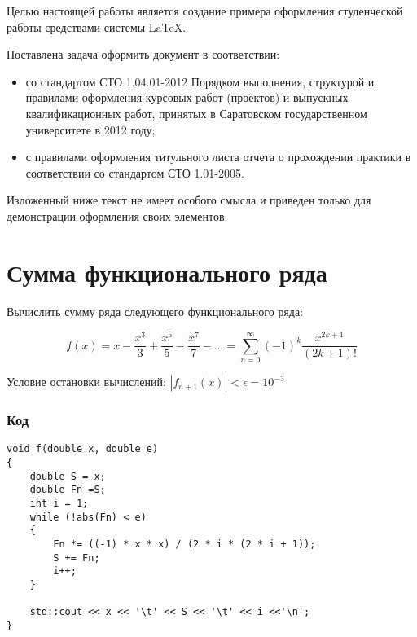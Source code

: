 \documentclass[bachelor, och, pract]{SCWorks}
\begin{document}
\tableofcontents






\intro
Целью настоящей работы является создание примера оформления студенческой работы средствами системы \LaTeX.

Поставлена задача оформить документ в соответствии:
\begin{itemize}
    \item со стандартом СТО 1.04.01-2012 Порядком выполнения, структурой и правилами оформления курсовых работ (проектов)
    и выпускных квалификационных работ, принятых в Саратовском государственном университете в 2012 году;
    \item с правилами оформления титульного листа отчета о прохождении практики в соответствии со стандартом СТО 1.01-2005.
\end{itemize}

Изложенный ниже текст не имеет особого смысла и приведен только для демонстрации оформления своих элементов\cite{MSDN}.

\section{Сумма функционального ряда}

Вычислить сумму ряда следующего функционального ряда:

$$ f(x) = x - \frac{x^3}{3} + \frac{x^5}{5} - \frac{x^7}{7} - ... =  \sum_{n=0}^{\infty} (-1)^k\frac{x^{2k+1}}{(2k+1)!}$$

Условие остановки вычислений: $|f_{n+1}(x)| < \epsilon = 10^{-3}$

\subsubsection{Код}

\begin{lstlisting}
void f(double x, double e)
{
    double S = x;
    double Fn =S;
    int i = 1;
    while (!abs(Fn) < e)
    {
        Fn *= ((-1) * x * x) / (2 * i * (2 * i + 1));
        S += Fn;
        i++;
    }
    
    std::cout << x << '\t' << S << '\t' << i <<'\n';
}
\end{lstlisting}
\end{document}
